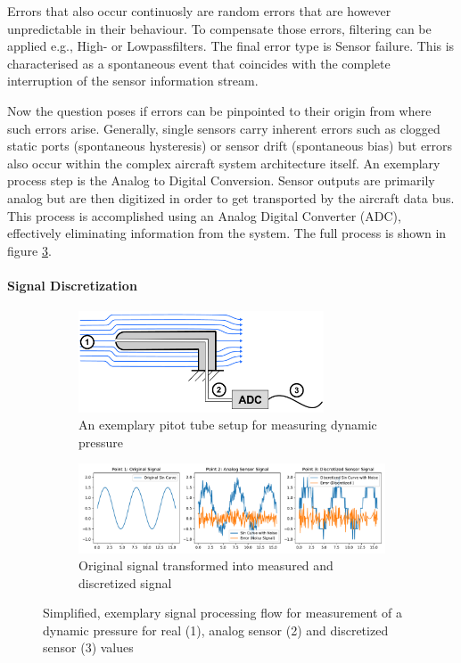 Errors that also occur continuosly are random errors that are however unpredictable in their behaviour. To compensate those errors, filtering can be applied e.g., High- or Lowpassfilters. The final error type is Sensor failure. This is characterised as a spontaneous event that coincides with the complete interruption of the sensor information stream.


Now the question poses if errors can be pinpointed to their origin from where such errors arise. Generally, single sensors carry inherent errors such as clogged static ports (spontaneous hysteresis) or sensor drift (spontaneous bias) but errors also occur within the complex aircraft system architecture itself. An exemplary process step is the Analog to Digital Conversion. Sensor outputs are primarily analog but are then digitized in order to get transported by the aircraft data bus. This process is accomplished using an Analog Digital Converter (ADC), effectively eliminating information from the system. The full process is shown in figure \ref{fig:signal_processing}.

\paragraph{Signal Discretization}





\begin{figure}[!h]
    \centering
    \begin{subfigure}{\textwidth}
        \centering
        \includegraphics[width=0.8\textwidth]{03_figures/signal_recording}
        \caption{An exemplary pitot tube setup for measuring dynamic pressure}
        \label{fig:signal_processing_setup}
    \end{subfigure}
    \begin{subfigure}{\textwidth}
        \centering
        \includegraphics[width=\textwidth]{03_figures/python_functions/images/signal_processing_plots}
        \caption{Original signal transformed into measured and discretized signal}
        \label{fig:signal_processing_plots}
    \end{subfigure}
    \caption{Simplified, exemplary signal processing flow for measurement of a dynamic pressure for real (1), analog sensor (2) and discretized sensor (3) values}
    \label{fig:signal_processing}
\end{figure}


